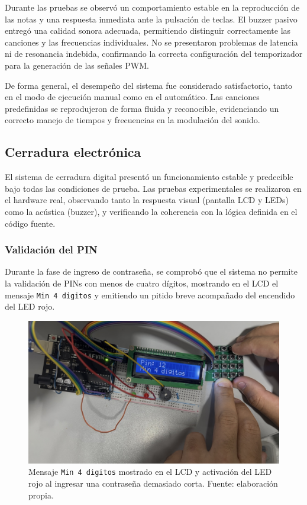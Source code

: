 Durante las pruebas se observó un comportamiento estable en la reproducción de las notas y una respuesta inmediata ante la pulsación de teclas. El buzzer pasivo entregó una calidad sonora adecuada, permitiendo distinguir correctamente las canciones y las frecuencias individuales. No se presentaron problemas de latencia ni de resonancia indebida, confirmando la correcta configuración del temporizador para la generación de las señales PWM.

De forma general, el desempeño del sistema fue considerado satisfactorio, tanto en el modo de ejecución manual como en el automático. Las canciones predefinidas se reprodujeron de forma fluida y reconocible, evidenciando un correcto manejo de tiempos y frecuencias en la modulación del sonido.


\subsection{Cerradura electrónica}

El sistema de cerradura digital presentó un funcionamiento estable y predecible bajo todas las condiciones de prueba. 
Las pruebas experimentales se realizaron en el hardware real, observando tanto la respuesta visual (pantalla LCD y LEDs) 
como la acústica (buzzer), y verificando la coherencia con la lógica definida en el código fuente.

\subsubsection{Validación del PIN}

Durante la fase de ingreso de contraseña, se comprobó que el sistema no permite la validación de PINs con menos de cuatro dígitos, 
mostrando en el LCD el mensaje \texttt{Min 4 digitos} y emitiendo un pitido breve acompañado del encendido del LED rojo.  

\begin{figure}[H]
    \centering
    \includegraphics[width=0.7\columnwidth]{Anexos/Cerradura_Min4.png}
    \caption{Mensaje \texttt{Min 4 digitos} mostrado en el LCD y activación del LED rojo al ingresar una contraseña demasiado corta. Fuente: elaboración propia.}
    \label{fig:cerradura_min4}
\end{figure}

